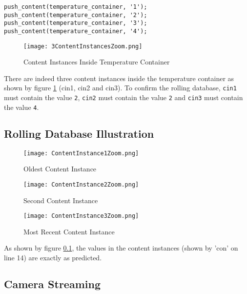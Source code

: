 \begin{lstlisting}[caption={Demonstrating a rolling database}, label={lst:rolling-database-demo}]
push_content(temperature_container, '1');
push_content(temperature_container, '2');
push_content(temperature_container, '3');
push_content(temperature_container, '4');
\end{lstlisting}

\begin{figure}[H]
  \centering
  \texttt{[image: 3ContentInstancesZoom.png]}
  \caption{Content Instances Inside Temperature Container}
  \label{fig:3ContentInstances}
\end{figure}

There are indeed three content instances inside the temperature container as shown by figure \ref{fig:3ContentInstances} (cin1, cin2 and cin3). To confirm the rolling database, \lstinline{cin1} must contain the value \lstinline{2}, \lstinline{cin2} must contain the value \lstinline{2} and \lstinline{cin3} must contain the value \lstinline{4}.

\subsection{Rolling Database Illustration}
\label{fig:RollingDatabase}

\begin{figure}[H]
\centering
\texttt{[image: ContentInstance1Zoom.png]}
\caption{Oldest Content Instance}
\label{fig:OldestContentInstance}
\end{figure}

\begin{figure}[H]
\centering
\texttt{[image: ContentInstance2Zoom.png]}
\caption{Second Content Instance}
\label{fig:SecondContentInstance}
\end{figure}

\begin{figure}[H]
\centering
\texttt{[image: ContentInstance3Zoom.png]}
\caption{Most Recent Content Instance}
\label{fig:MostRecentContentInstance}
\end{figure}

As shown by figure \ref{fig:RollingDatabase}, the values in the content instances (shown by 'con' on line 14) are exactly as predicted. 

\subsection{Camera Streaming}


